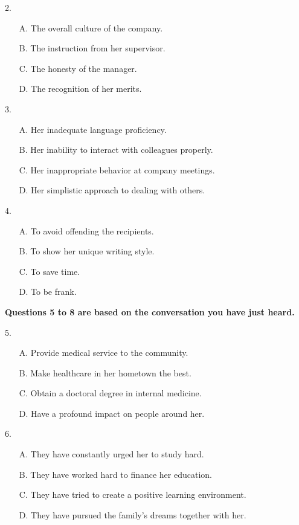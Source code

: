 \documentclass[UTF8,11pt]{ctexart}
\begin{document}
2.


\begin{itemize}[leftmargin=2em,itemsep=.2em,topsep=.4em]\item[A.] The overall culture of the company.
\item[B.] The instruction from her supervisor.
\item[C.] The honesty of the manager.
\item[D.] The recognition of her merits.
\end{itemize}

3.


\begin{itemize}[leftmargin=2em,itemsep=.2em,topsep=.4em]\item[A.] Her inadequate language proficiency.
\item[B.] Her inability to interact with colleagues properly.
\item[C.] Her inappropriate behavior at company meetings.
\item[D.] Her simplistic approach to dealing with others.
\end{itemize}

4.


\begin{itemize}[leftmargin=2em,itemsep=.2em,topsep=.4em]\item[A.] To avoid offending the recipients.
\item[B.] To show her unique writing style.
\item[C.] To save time.
\item[D.] To be frank.
\end{itemize}

\textbf{Questions 5 to 8 are based on the conversation you have just heard.}


5.


\begin{itemize}[leftmargin=2em,itemsep=.2em,topsep=.4em]\item[A.] Provide medical service to the community.
\item[B.] Make healthcare in her hometown the best.
\item[C.] Obtain a doctoral degree in internal medicine.
\item[D.] Have a profound impact on people around her.
\end{itemize}

6.


\begin{itemize}[leftmargin=2em,itemsep=.2em,topsep=.4em]\item[A.] They have constantly urged her to study hard.
\item[B.] They have worked hard to finance her education.
\item[C.] They have tried to create a positive learning environment.
\item[D.] They have pursued the family’s dreams together with her.
\end{itemize}
\end{document}

